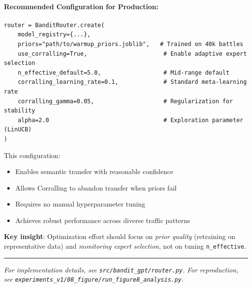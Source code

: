 
\paragraph{Recommended Configuration for Production:}

\begin{verbatim}
router = BanditRouter.create(
    model_registry={...},
    priors="path/to/warmup_priors.joblib",   # Trained on 40k battles
    use_corralling=True,                      # Enable adaptive expert selection
    n_effective_default=5.0,                  # Mid-range default
    corralling_learning_rate=0.1,             # Standard meta-learning rate
    corralling_gamma=0.05,                    # Regularization for stability
    alpha=2.0                                 # Exploration parameter (LinUCB)
)
\end{verbatim}

This configuration:
\begin{itemize}[leftmargin=*, itemsep=1pt]
    \item Enables semantic transfer with reasonable confidence
    \item Allows Corralling to abandon transfer when priors fail
    \item Requires no manual hyperparameter tuning
    \item Achieves robust performance across diverse traffic patterns
\end{itemize}

\textbf{Key insight}: Optimization effort should focus on \textit{prior quality} (retraining on representative data) and \textit{monitoring expert selection}, not on tuning \texttt{n\_effective}.

\vspace{0.3cm}
\hrule
\vspace{0.2cm}
\textit{For implementation details, see \texttt{src/bandit\_gpt/router.py}. For reproduction, see \texttt{experiments\_v1/08\_figure/run\_figure8\_analysis.py}.}
